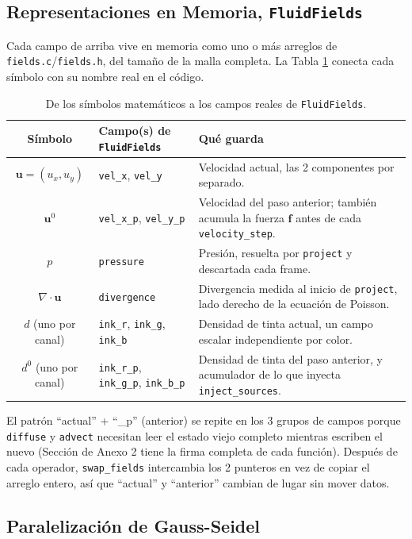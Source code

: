 \documentclass[11pt]{article}
\begin{document}
\subsection{Representaciones en Memoria, \texttt{FluidFields}}

Cada campo de arriba vive en memoria como uno o más arreglos de
\texttt{fields.c}/\texttt{fields.h}, del tamaño de la malla completa. La
Tabla \ref{tab:fields-map} conecta cada símbolo con su nombre real en el
código.

\begin{table}[ht]
\centering
\begin{tabular}{clp{7.5cm}}
\toprule
Símbolo & Campo(s) de \texttt{FluidFields} & Qué guarda \\
\midrule
$\mathbf{u} = (u_x, u_y)$ & \texttt{vel\_x}, \texttt{vel\_y} & Velocidad actual, las 2 componentes por separado. \\
$\mathbf{u}^0$ & \texttt{vel\_x\_p}, \texttt{vel\_y\_p} & Velocidad del paso anterior; también acumula la fuerza $\mathbf{f}$ antes de cada \texttt{velocity\_step}. \\
$p$ & \texttt{pressure} & Presión, resuelta por \texttt{project} y descartada cada frame. \\
$\nabla \cdot \mathbf{u}$ & \texttt{divergence} & Divergencia medida al inicio de \texttt{project}, lado derecho de la ecuación de Poisson. \\
$d$ (uno por canal) & \texttt{ink\_r}, \texttt{ink\_g}, \texttt{ink\_b} & Densidad de tinta actual, un campo escalar independiente por color. \\
$d^0$ (uno por canal) & \texttt{ink\_r\_p}, \texttt{ink\_g\_p}, \texttt{ink\_b\_p} & Densidad de tinta del paso anterior, y acumulador de lo que inyecta \texttt{inject\_sources}. \\
\bottomrule
\end{tabular}
\caption{De los símbolos matemáticos a los campos reales de \texttt{FluidFields}.}
\label{tab:fields-map}
\end{table}

El patrón ``actual'' + ``\_p'' (anterior) se repite en los 3 grupos de
campos porque \texttt{diffuse} y \texttt{advect} necesitan leer el estado
viejo completo mientras escriben el nuevo (Sección de Anexo 2 tiene la
firma completa de cada función). Después de cada operador,
\texttt{swap\_fields} intercambia los 2 punteros en vez de copiar el
arreglo entero, así que ``actual'' y ``anterior'' cambian de lugar sin
mover datos.

\subsection{Paralelización de Gauss-Seidel}
\end{document}
